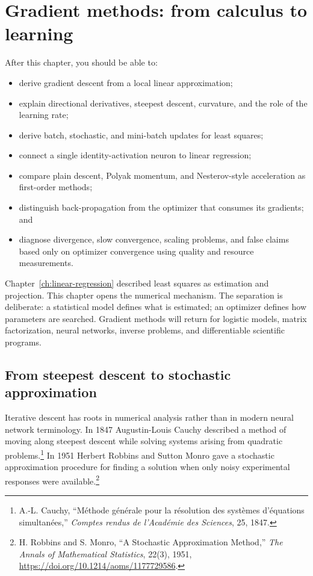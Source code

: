 \chapter{Gradient methods: from calculus to learning}
\label{ch:gradient-descent}

\begin{learningobjectives}
After this chapter, you should be able to:
\begin{itemize}
  \item derive gradient descent from a local linear approximation;
  \item explain directional derivatives, steepest descent, curvature, and the
  role of the learning rate;
  \item derive batch, stochastic, and mini-batch updates for least squares;
  \item connect a single identity-activation neuron to linear regression;
  \item compare plain descent, Polyak momentum, and Nesterov-style acceleration
  as first-order methods;
  \item distinguish back-propagation from the optimizer that consumes its
  gradients; and
  \item diagnose divergence, slow convergence, scaling problems, and false
  claims based only on optimizer convergence using quality and resource
  measurements.
\end{itemize}
\end{learningobjectives}

\begin{chapterconnection}
Chapter~\ref{ch:linear-regression} described least squares as estimation and
projection. This chapter opens the numerical mechanism. The separation is
deliberate: a statistical model defines what is estimated; an optimizer defines
how parameters are searched. Gradient methods will return for logistic models,
matrix factorization, neural networks, inverse problems, and differentiable
scientific programs.
\end{chapterconnection}

\section{From steepest descent to stochastic approximation}

Iterative descent has roots in numerical analysis rather than in modern neural
network terminology. In 1847 Augustin-Louis Cauchy described a method of moving
along steepest descent while solving systems arising from quadratic
problems.\footnote{A.-L. Cauchy, ``M\'ethode g\'en\'erale pour la r\'esolution
des syst\`emes d'\'equations simultan\'ees,'' \emph{Comptes rendus de
l'Acad\'emie des Sciences}, 25, 1847.} In 1951 Herbert Robbins and Sutton Monro
gave a stochastic approximation procedure for finding a solution when only
noisy experimental responses were available.\footnote{H. Robbins and S.
Monro, ``A Stochastic Approximation Method,'' \emph{The Annals of Mathematical
Statistics}, 22(3), 1951,
\url{https://doi.org/10.1214/aoms/1177729586}.}

